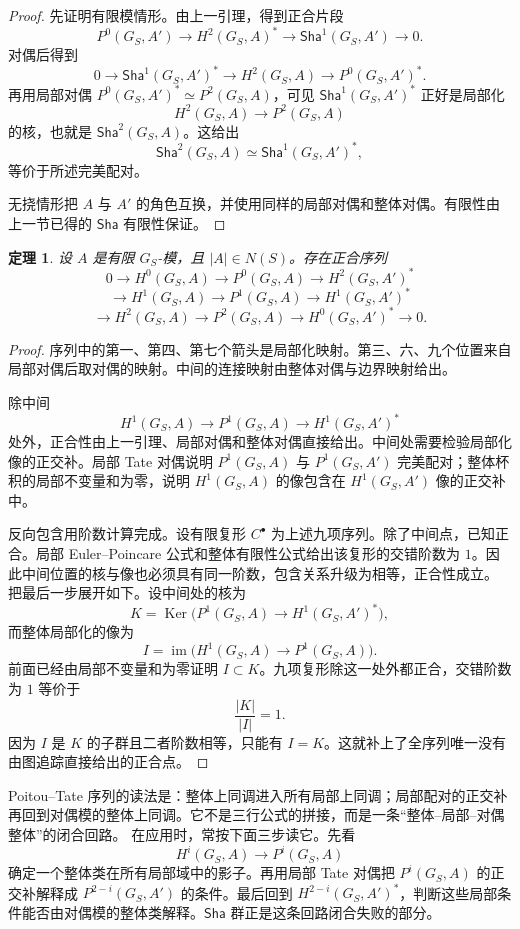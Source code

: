 \documentclass[11pt,a4paper,openany]{ctexbook}
\numberwithin{equation}{chapter}
\newcommand{\Ker}{\operatorname{Ker}}
\newcommand{\Sha}{\mathsf{Sha}}
\theoremstyle{plain}
\newtheorem{theorem}{定理}[chapter]
\theoremstyle{definition}
\theoremstyle{remark}
\begin{document}
\begin{proof}
先证明有限模情形。由上一引理，得到正合片段
\[
P^0(G_S,A')\to H^2(G_S,A)^*\to \Sha^1(G_S,A')\to 0.
\]
对偶后得到
\[
0\to \Sha^1(G_S,A')^*\to H^2(G_S,A)\to P^0(G_S,A')^*.
\]
再用局部对偶 $P^0(G_S,A')^*\simeq P^2(G_S,A)$，可见 $\Sha^1(G_S,A')^*$ 正好是局部化
\[
H^2(G_S,A)\to P^2(G_S,A)
\]
的核，也就是 $\Sha^2(G_S,A)$。这给出
\[
\Sha^2(G_S,A)\simeq \Sha^1(G_S,A')^*,
\]
等价于所述完美配对。

无挠情形把 $A$ 与 $A'$ 的角色互换，并使用同样的局部对偶和整体对偶。有限性由上一节已得的 $\Sha$ 有限性保证。
\end{proof}

\begin{theorem}
设 $A$ 是有限 $G_S$-模，且 $|A|\in N(S)$。存在正合序列
\[
0\to H^0(G_S,A)\to P^0(G_S,A)\to H^2(G_S,A')^*
\]
\[
\to H^1(G_S,A)\to P^1(G_S,A)\to H^1(G_S,A')^*
\]
\[
\to H^2(G_S,A)\to P^2(G_S,A)\to H^0(G_S,A')^*\to 0.
\]
\end{theorem}

\begin{proof}
序列中的第一、第四、第七个箭头是局部化映射。第三、六、九个位置来自局部对偶后取对偶的映射。中间的连接映射由整体对偶与边界映射给出。

除中间
\[
H^1(G_S,A)\to P^1(G_S,A)\to H^1(G_S,A')^*
\]
处外，正合性由上一引理、局部对偶和整体对偶直接给出。中间处需要检验局部化像的正交补。局部 Tate 对偶说明 $P^1(G_S,A)$ 与 $P^1(G_S,A')$ 完美配对；整体杯积的局部不变量和为零，说明 $H^1(G_S,A)$ 的像包含在 $H^1(G_S,A')$ 像的正交补中。

反向包含用阶数计算完成。设有限复形 $C^\bullet$ 为上述九项序列。除了中间点，已知正合。局部 Euler--Poincare 公式和整体有限性公式给出该复形的交错阶数为 $1$。因此中间位置的核与像也必须具有同一阶数，包含关系升级为相等，正合性成立。
把最后一步展开如下。设中间处的核为
\[
K=\Ker\bigl(P^1(G_S,A)\to H^1(G_S,A')^*\bigr),
\]
而整体局部化的像为
\[
I=\operatorname{im}\bigl(H^1(G_S,A)\to P^1(G_S,A)\bigr).
\]
前面已经由局部不变量和为零证明 $I\subset K$。九项复形除这一处外都正合，交错阶数为 $1$ 等价于
\[
\frac{|K|}{|I|}=1.
\]
因为 $I$ 是 $K$ 的子群且二者阶数相等，只能有 $I=K$。这就补上了全序列唯一没有由图追踪直接给出的正合点。
\end{proof}

Poitou--Tate 序列的读法是：整体上同调进入所有局部上同调；局部配对的正交补再回到对偶模的整体上同调。它不是三行公式的拼接，而是一条“整体--局部--对偶整体”的闭合回路。
在应用时，常按下面三步读它。先看
\[
H^i(G_S,A)\to P^i(G_S,A)
\]
确定一个整体类在所有局部域中的影子。再用局部 Tate 对偶把 $P^i(G_S,A)$ 的正交补解释成 $P^{2-i}(G_S,A')$ 的条件。最后回到 $H^{2-i}(G_S,A')^*$，判断这些局部条件能否由对偶模的整体类解释。$\Sha$ 群正是这条回路闭合失败的部分。
\end{document}

